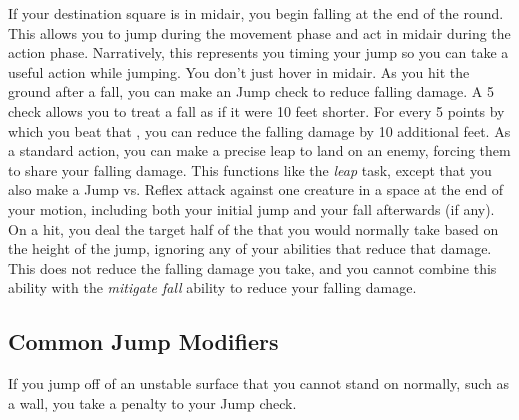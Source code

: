         If your destination square is in midair, you begin falling at the end of the round.
        This allows you to jump during the movement phase and act in midair during the action phase.
        Narratively, this represents you timing your jump so you can take a useful action while jumping.
        You don't just hover in midair.
         As you hit the ground after a fall, you can make an Jump check to reduce falling damage.
        A  5 check allows you to treat a fall as if it were 10 feet shorter.
        For every 5 points by which you beat that , you can reduce the falling damage by 10 additional feet.
         As a standard action, you can make a precise leap to land on an enemy, forcing them to share your falling damage.
        This functions like the \textit{leap} task, except that you also make a Jump vs. Reflex attack against one creature in a space at the end of your motion, including both your initial jump and your fall afterwards (if any).
        On a hit, you deal the target half of the  that you would normally take based on the height of the jump, ignoring any of your abilities that reduce that damage.
        This does not reduce the falling damage you take, and you cannot combine this ability with the \textit{mitigate fall} ability to reduce your falling damage.

    \subsection{Common Jump Modifiers}
        If you jump off of an unstable surface that you cannot stand on normally, such as a wall, you take a  penalty to your Jump check.

